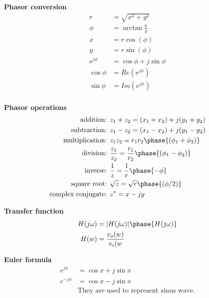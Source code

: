 \textbf{Phasor conversion}
\begin{align*}
    r &= \sqrt{x^2+y^2} \\
    \phi &= \arctan{\frac{x}{y}} \\
    x &= r\cos(\phi) \\
    y &= r\sin(\phi) \\
    e^{j\phi} &= \cos{\phi} + j\sin{\phi} \\
    \cos\phi &= Re(e^{j\phi}) \\
    \sin\phi &= Im(e^{j\phi}) \\
\end{align*}


\textbf{Phasor operations}
\begin{align*}
    \text{addition: }& z_1+z_2 = (x_1+x_2)+j(y_1+y_2) \\
    \text{subtraction: }& z_1-z_2 = (x_1-x_2)+j(y_1-y_2) \\
    \text{multiplication: }& z_1z_2 = r_1r_2\phase{(\phi_1+\phi_2)} \\
    \text{division: }& \frac{z_1}{z_2} = \frac{r_1}{r_2}\phase{(\phi_1-\phi_2)} \\
    \text{inverse: }& \frac{1}{z} = \frac{1}{r}\phase{-\phi} \\
    \text{square root: }& \sqrt{z} = \sqrt{r}\phase{(\phi/2)} \\
    \text{complex conjugate: }& z^* = x-jy \\
\end{align*}

\textbf{Transfer function}
\begin{align*}
    H(j\omega) &= |H(j\omega)|\phase{H(j\omega)} \\
    H(w) &= \frac{v_o(w)}{v_i(w}
\end{align*}

\textbf{Euler formula}
\begin{align*}
    e^{jx}  &= \cos{x}+j\sin{x} \\
    e^{-jx} &= \cos{x}-j\sin{x} \\
    &\text{They are used to represent sinus wave.}
\end{align*}

